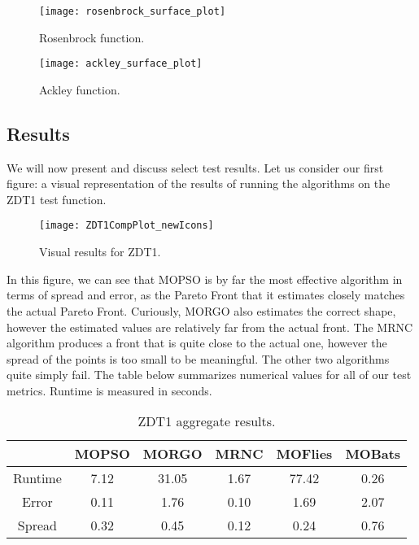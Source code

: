 \documentclass[letterpaper, 10 pt, conference]{ieeeconf}  %
\begin{document}
\begin{figure}[H]
\texttt{[image: rosenbrock\_surface\_plot]}
\caption{Rosenbrock function.}
\label{fig:rossurfplot}
\end{figure}

\begin{figure}[H]
\texttt{[image: ackley\_surface\_plot]}
\caption{Ackley function.}
\label{fig:ackleysurfplot}
\end{figure}

\subsection{Results}

We will now present and discuss select test results. Let us consider our first figure: a visual representation of the results of running the algorithms on the ZDT1 test function.

\begin{figure}[h]
\texttt{[image: ZDT1CompPlot\_newIcons]}
\caption{Visual results for ZDT1.}
\label{fig:zdt1visual}
\end{figure}

In this figure, we can see that MOPSO is by far the most effective algorithm in terms of spread and error, as the Pareto Front that it estimates closely matches the actual Pareto Front. Curiously, MORGO also estimates the correct shape, however the estimated values are relatively far from the actual front. The MRNC algorithm produces a front that is quite close to the actual one, however the spread of the points is too small to be meaningful. The other two algorithms quite simply fail. The table below summarizes numerical values for all of our test metrics.  Runtime is measured in seconds.


\begin{table}[htp]
\centering
 \begin{tabular}{||c c c c c c||} 
 \hline
 & MOPSO & MORGO & MRNC & MOFlies & MOBats \\
 \hline \hline
 Runtime &  7.12 &  31.05 & 1.67 & 77.42 & 0.26 \\
 \hline
 Error & 0.11 & 1.76 & 0.10 & 1.69 & 2.07 \\
 \hline
 Spread & 0.32 & 0.45 & 0.12 & 0.24 & 0.76 \\
 \hline
\end{tabular}
\caption{ZDT1 aggregate results.}
\label{tab:zdt1agg}
\end{table}
\end{document}
